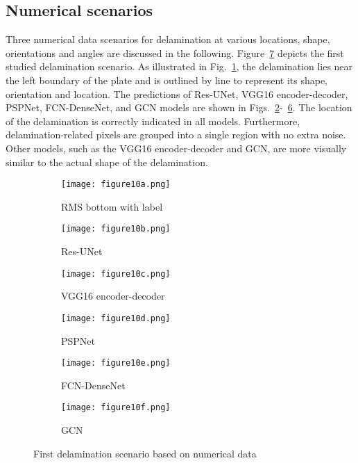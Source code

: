 \subsection{Numerical scenarios}
Three numerical data scenarios for delamination at various locations, shape, orientations and angles are discussed in the following.
Figure~\ref{fig:softmax_448} depicts the first studied delamination scenario.
As illustrated in Fig.~\ref{fig:RMS_flat_shell_Vz_448}, the delamination lies near the left boundary of the plate and is outlined by line to represent its shape, orientation and location.
The predictions of Res-UNet, VGG16 encoder-decoder, PSPNet, FCN-DenseNet, and GCN models are shown in Figs.~\ref{fig:unet_pred_448}-~\ref{fig:gcn_pred_448}.
The location of the delamination is correctly indicated in all models.
Furthermore, delamination-related pixels are grouped into a single region with no extra noise.
Other models, such as the VGG16 encoder-decoder and GCN, are more visually similar to the actual shape of the delamination.
\begin{figure}[!h]
	\centering
	\begin{subfigure}[b]{0.47\textwidth}
		\centering
		\texttt{[image: figure10a.png]}
		\caption{RMS bottom with label}
		\label{fig:RMS_flat_shell_Vz_448}
	\end{subfigure}
	\hfill
	\begin{subfigure}[b]{0.47\textwidth}
		\centering
		\texttt{[image: figure10b.png]}
		\caption{Res-UNet}
		\label{fig:unet_pred_448}
	\end{subfigure}
	\hfill
	\begin{subfigure}[b]{0.47\textwidth}
		\centering
		\texttt{[image: figure10c.png]}
		\caption{VGG16 encoder-decoder}
		\label{fig:vgg16_pred_448}
	\end{subfigure}
	\hfill
	\begin{subfigure}[b]{0.47\textwidth}
		\centering
		\texttt{[image: figure10d.png]}
		\caption{PSPNet}
		\label{fig:pspnet_pred_448}
	\end{subfigure}
	\hfill
	\begin{subfigure}[b]{0.47\textwidth}
		\centering
		\texttt{[image: figure10e.png]}
		\caption{FCN-DenseNet}
		\label{fig:fcn_densenet_pred_448}
	\end{subfigure}
	\hfill
	\begin{subfigure}[b]{0.47\textwidth}
		\centering
		\texttt{[image: figure10f.png]}
		\caption{GCN}
		\label{fig:gcn_pred_448}
	\end{subfigure}
	\caption{First delamination scenario based on numerical data}
	\label{fig:softmax_448}
\end{figure} 
\clearpage

